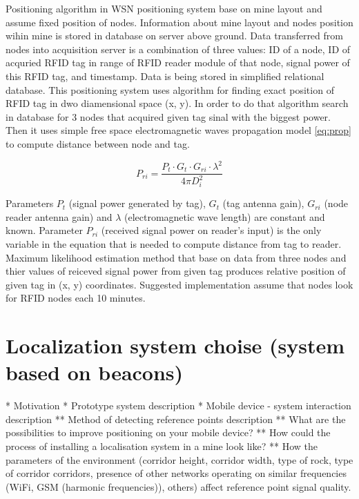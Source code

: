 \documentclass[../main.tex]{subfiles}
\begin{document}
Positioning algorithm in WSN positioning system base on mine layout and assume fixed position of nodes. Information about mine layout and nodes position wihin mine is stored in database on server above ground. Data transferred from nodes into acquisition server is a combination of three values: ID of a node, ID of acquried RFID tag in range of RFID reader module of that node, signal power of this RFID tag, and timestamp. Data is being stored in simplified relational database. This positioning system uses algorithm for finding exact position of RFID tag in dwo diamensional space (x, y). In order to do that algorithm search in database for 3 nodes that acquired given tag sinal with the biggest power. Then it uses simple free space electromagnetic waves propagation model \eqref{eq:prop} to compute distance between node and tag.

\begin{equation}
\label{eq:prop}
P_{ri}=\frac{P_t \cdot G_t \cdot G_{ri} \cdot \lambda^2}{4\pi D_i^2}
\end{equation}

Parameters $P_t$ (signal power generated by tag), $G_t$ (tag antenna gain), $G_{ri}$ (node reader antenna gain) and $\lambda$ (electromagnetic wave length) are constant and known. Parameter ${P_{ri}}$ (received signal power on reader's input) is the only variable in the equation that is needed to compute distance from tag to reader. Maximum likelihood estimation method that base on data from three nodes and thier values of reiceved signal power from given tag produces relative position of given tag in (x, y) coordinates. Suggested implementation \cite{WSN_tracking} assume that nodes look for RFID nodes each 10 minutes.


\section{Localization system choise (system based on beacons)}
* Motivation
* Prototype system description
* Mobile device - system interaction description
** Method of detecting reference points description
** What are the possibilities to improve positioning on your mobile device?
** How could the process of installing a localisation system in a mine look like?
** How the parameters of the environment (corridor height, corridor width, type of rock, type of corridor corridors, presence of other networks operating on similar frequencies (WiFi, GSM (harmonic frequencies)), others) affect reference point signal quality.
\end{document}
